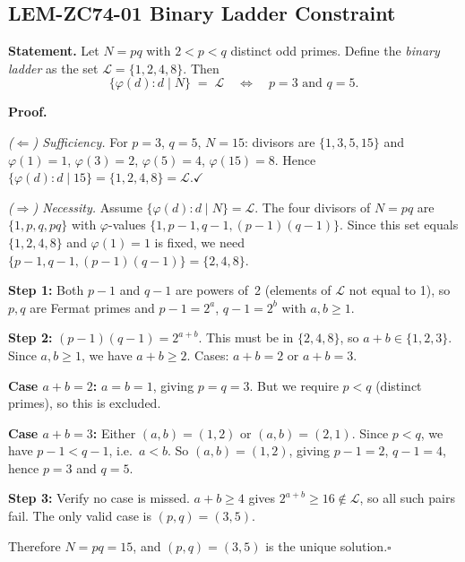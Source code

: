\documentclass[12pt, a4paper]{article}
\begin{document}
\subsection{LEM-ZC74-01 \quad Binary Ladder Constraint}
\label{sec:lem01}


\begin{formalbox}[title={LEM-ZC74-01: Binary Ladder Constraint
  for Squarefree Semiprimes ($R_0$, Exact)}]

\textbf{Statement.}
Let $N = pq$ with $2 < p < q$ distinct odd primes.
Define the \emph{binary ladder} as the set $\mathcal{L} = \{1, 2, 4, 8\}$.
Then
\[
  \bigl\{\varphi(d) : d \mid N\bigr\}
  \;=\; \mathcal{L}
  \quad\Longleftrightarrow\quad
  p = 3 \text{ and } q = 5.
\]

\textbf{Proof.}

\textit{($\Leftarrow$) Sufficiency.}
For $p = 3$, $q = 5$, $N = 15$: divisors are $\{1, 3, 5, 15\}$ and
$\varphi(1) = 1$, $\varphi(3) = 2$, $\varphi(5) = 4$, $\varphi(15) = 8$.
Hence $\{\varphi(d) : d \mid 15\} = \{1, 2, 4, 8\} = \mathcal{L}$.\hfill$\checkmark$

\textit{($\Rightarrow$) Necessity.}
Assume $\{\varphi(d) : d \mid N\} = \mathcal{L}$.
The four divisors of $N = pq$ are $\{1, p, q, pq\}$ with
$\varphi$-values $\{1, p-1, q-1, (p-1)(q-1)\}$.
Since this set equals $\{1, 2, 4, 8\}$ and $\varphi(1) = 1$
is fixed, we need $\{p-1, q-1, (p-1)(q-1)\} = \{2, 4, 8\}$.

\textbf{Step 1:} Both $p-1$ and $q-1$ are powers of~2
(elements of $\mathcal{L}$ not equal to 1), so $p, q$ are
Fermat primes and $p - 1 = 2^a$, $q - 1 = 2^b$ with $a, b \geq 1$.

\textbf{Step 2:} $(p-1)(q-1) = 2^{a+b}$.
This must be in $\{2, 4, 8\}$, so $a + b \in \{1, 2, 3\}$.
Since $a, b \geq 1$, we have $a + b \geq 2$.
Cases: $a + b = 2$ or $a + b = 3$.

\textbf{Case $a + b = 2$:} $a = b = 1$, giving $p = q = 3$.
But we require $p < q$ (distinct primes), so this is excluded.

\textbf{Case $a + b = 3$:} Either $(a,b) = (1,2)$ or $(a,b) = (2,1)$.
Since $p < q$, we have $p - 1 < q - 1$, i.e.\ $a < b$.
So $(a, b) = (1, 2)$, giving $p - 1 = 2$, $q - 1 = 4$, hence
$p = 3$ and $q = 5$.

\textbf{Step 3:} Verify no case is missed.
$a + b \geq 4$ gives $2^{a+b} \geq 16 \notin \mathcal{L}$,
so all such pairs fail. The only valid case is $(p, q) = (3, 5)$.

Therefore $N = pq = 15$, and $(p, q) = (3, 5)$ is the unique
solution.\hfill$\square$
\end{formalbox}
\end{document}
